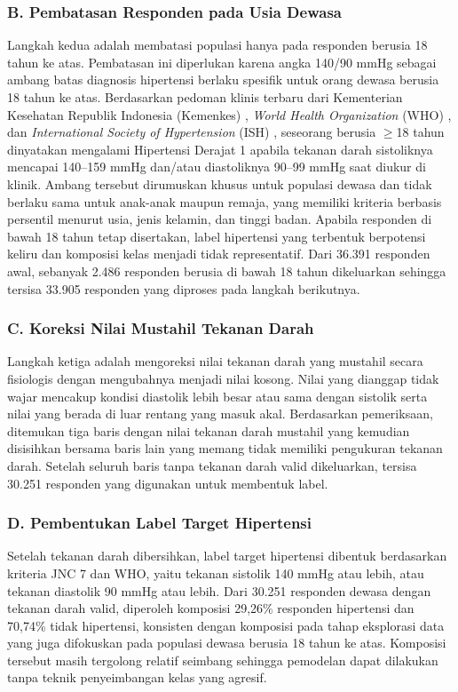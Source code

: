 \subsubsection*{B. Pembatasan Responden pada Usia Dewasa}
Langkah kedua adalah membatasi populasi hanya pada responden berusia 18 tahun ke atas. Pembatasan ini diperlukan karena angka 140/90 mmHg sebagai ambang batas diagnosis hipertensi berlaku spesifik untuk orang dewasa berusia 18 tahun ke atas. Berdasarkan pedoman klinis terbaru dari Kementerian Kesehatan Republik Indonesia (Kemenkes) \autocite{ri2018}, \emph{World Health Organization} (WHO) \autocite{WHO2023}, dan \emph{International Society of Hypertension} (ISH) \autocite{Unger2020}, seseorang berusia $\geq$18 tahun dinyatakan mengalami Hipertensi Derajat 1 apabila tekanan darah sistoliknya mencapai 140--159 mmHg dan/atau diastoliknya 90--99 mmHg saat diukur di klinik. Ambang tersebut dirumuskan khusus untuk populasi dewasa dan tidak berlaku sama untuk anak-anak maupun remaja, yang memiliki kriteria berbasis persentil menurut usia, jenis kelamin, dan tinggi badan. Apabila responden di bawah 18 tahun tetap disertakan, label hipertensi yang terbentuk berpotensi keliru dan komposisi kelas menjadi tidak representatif. Dari 36.391 responden awal, sebanyak 2.486 responden berusia di bawah 18 tahun dikeluarkan sehingga tersisa 33.905 responden yang diproses pada langkah berikutnya.

\subsubsection*{C. Koreksi Nilai Mustahil Tekanan Darah}
Langkah ketiga adalah mengoreksi nilai tekanan darah yang mustahil secara fisiologis dengan mengubahnya menjadi nilai kosong. Nilai yang dianggap tidak wajar mencakup kondisi diastolik lebih besar atau sama dengan sistolik serta nilai yang berada di luar rentang yang masuk akal. Berdasarkan pemeriksaan, ditemukan tiga baris dengan nilai tekanan darah mustahil yang kemudian disisihkan bersama baris lain yang memang tidak memiliki pengukuran tekanan darah. Setelah seluruh baris tanpa tekanan darah valid dikeluarkan, tersisa 30.251 responden yang digunakan untuk membentuk label.

\subsubsection*{D. Pembentukan Label Target Hipertensi}
Setelah tekanan darah dibersihkan, label target hipertensi dibentuk berdasarkan kriteria JNC 7 dan WHO, yaitu tekanan sistolik 140 mmHg atau lebih, atau tekanan diastolik 90 mmHg atau lebih. Dari 30.251 responden dewasa dengan tekanan darah valid, diperoleh komposisi 29,26\% responden hipertensi dan 70,74\% tidak hipertensi, konsisten dengan komposisi pada tahap eksplorasi data yang juga difokuskan pada populasi dewasa berusia 18 tahun ke atas. Komposisi tersebut masih tergolong relatif seimbang sehingga pemodelan dapat dilakukan tanpa teknik penyeimbangan kelas yang agresif.

